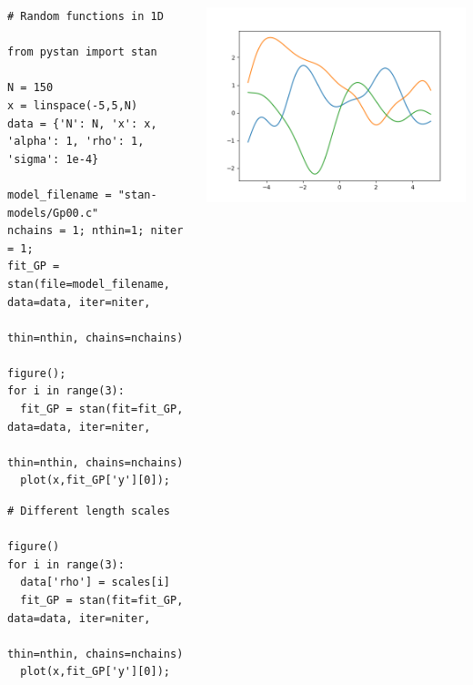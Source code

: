 \documentclass[presentation]{beamer}
\begin{document}
\begin{frame}[fragile,label={sec:org750f981}]{}
 \begin{columns}
\begin{column}{0.55\columnwidth}
\begin{verbatim}
# Random functions in 1D

from pystan import stan

N = 150
x = linspace(-5,5,N)
data = {'N': N, 'x': x, 'alpha': 1, 'rho': 1, 'sigma': 1e-4}

model_filename = "stan-models/Gp00.c"
nchains = 1; nthin=1; niter = 1;
fit_GP = stan(file=model_filename, data=data, iter=niter,
                                   thin=nthin, chains=nchains)

figure();
for i in range(3):
  fit_GP = stan(fit=fit_GP, data=data, iter=niter,
                            thin=nthin, chains=nchains)
  plot(x,fit_GP['y'][0]);

\end{verbatim}

\begin{verbatim}
# Different length scales

figure()
for i in range(3):
  data['rho'] = scales[i]
  fit_GP = stan(fit=fit_GP, data=data, iter=niter,
                            thin=nthin, chains=nchains)
  plot(x,fit_GP['y'][0]);

\end{verbatim}
\end{column}

\begin{column}{0.4\columnwidth}
\begin{center}
\includegraphics[width=.9\linewidth]{images/figStan01.png}
\end{center}


\end{column}
\end{columns}
\end{frame}
\end{document}
